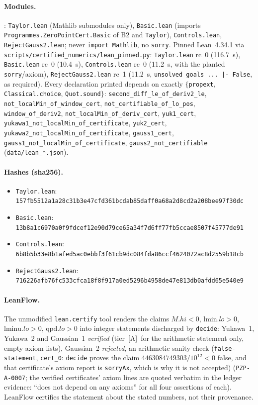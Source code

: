 \documentclass[10pt]{article}
\newcommand{\tier}[1]{\textsf{[#1]}}
\newcommand{\tA}{\tier{A}}
\newcommand{\lean}[1]{\texttt{#1}}
\begin{document}
\paragraph{Modules.} : \texttt{Taylor.lean} (Mathlib submodules only), \texttt{Basic.lean} (imports \lean{Programmes.ZeroPointCert.Basic} of B2 and \lean{Taylor}), \texttt{Controls.lean}, \texttt{RejectGauss2.lean}; never \lean{import Mathlib}, no \lean{sorry}. Pinned Lean~4.34.1 via \texttt{scripts/certified\_numerics/lean\_pinned.py}: \texttt{Taylor.lean} rc~0 (116.7~s), \texttt{Basic.lean} rc~0 (10.4~s), \texttt{Controls.lean} rc~0 (11.2~s, with the planted \lean{sorry}/axiom), \texttt{RejectGauss2.lean} rc~1 (11.2~s, \lean{unsolved goals ... |- False}, as required). Every declaration printed depends on exactly $\{$\lean{propext}, \lean{Classical.choice}, \lean{Quot.sound}$\}$: \lean{second\_diff\_le\_of\_deriv2\_le}, \lean{not\_localMin\_of\_window\_cert}, \lean{not\_certifiable\_of\_lo\_pos}, \lean{window\_of\_deriv2}, \lean{not\_localMin\_of\_deriv\_cert}, \lean{yuk1\_cert}, \lean{yukawa1\_not\_localMin\_of\_certificate}, \lean{yuk2\_cert}, \lean{yukawa2\_not\_localMin\_of\_certificate}, \lean{gauss1\_cert}, \lean{gauss1\_not\_localMin\_of\_certificate}, \lean{gauss2\_not\_certifiable} (\texttt{data/lean\_*.json}).
\paragraph{Hashes (sha256).}
\begin{itemize}\scriptsize\itemsep=0pt
\item \texttt{Taylor.lean}: \texttt{157fb5512a1a28c31b3e47cfd361bcdab85daff0a68a2d8cd2a208bee97f30dc}
\item \texttt{Basic.lean}: \texttt{13b8a1c6970a0f9fdcef12e90d79ce65a34f7d6ff77fb5ccae8507f45777de91}
\item \texttt{Controls.lean}: \texttt{6b8b5b33e8b1afed5ac0ebbf3f61cb9dc084fda86ccf4624072ac8d2559b18cb}
\item \texttt{RejectGauss2.lean}: \texttt{716226afb76fc533cfca18f8f917a0ed5296b4958de47e813db0afdd65e540e9}
\end{itemize}
\paragraph{LeanFlow.} The unmodified \lean{lean.certify} tool renders the claims $M.hi<0$, $\mathrm{lmin}.lo>0$, $\mathrm{lminu}.lo>0$, $\mathrm{qpd}.lo>0$ into integer statements discharged by \lean{decide}: Yukawa~1, Yukawa~2 and Gaussian~1 \emph{verified} (tier~\tA\ for the arithmetic statement only, empty axiom lists), Gaussian~2 \emph{rejected}, an arithmetic sanity check (\texttt{false-statement}, \lean{cert\_0}: \lean{decide} proves the claim $4463084749303/10^{12}<0$ false, and that certificate's axiom report is \lean{sorryAx}, which is why it is not accepted) (\texttt{PZP-A-0007}; the verified certificates' axiom lines are quoted verbatim in the ledger evidence: ``does not depend on any axioms'' for all four assertions of each). LeanFlow certifies the statement about the stated numbers, not their provenance.
\end{document}

